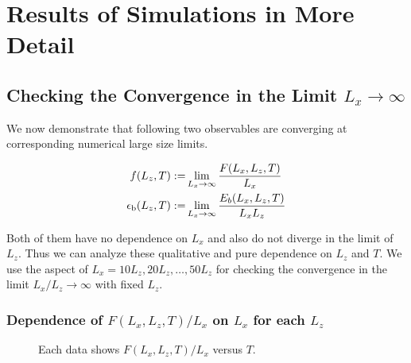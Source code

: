 
\chapter{Results of Simulations in More Detail}

\section{Checking the Convergence in the Limit $L_{x}\to\infty$}
\label{sec:convcheck}

We now demonstrate that following two observables are converging at corresponding numerical large size limits.

\begin{align}
	f(L_{z}, T):=&\lim_{L_{x}\to\infty}\frac{F(L_{x}, L_{z}, T)}{L_{x}}\\
	\epsilon_{\rm b}(L_{z}, T):=&\lim_{L_{x}\to\infty}\frac{E_{b}(L_{x}, L_{z}, T)}{L_{x}L_{z}}
\end{align}

Both of them have no dependence on $L_{x}$ and also do not diverge in the limit of $L_{z}$. Thus we can analyze these qualitative and pure dependence on $L_{z}$ and $T$. We use the aspect of $L_{x}=10L_{z}, 20L_{z}, \dots, 50L_{z}$ for checking the convergence in the limit $L_{x}/L_{z} \to \infty$ with fixed $L_{z}$.

\subsection{Dependence of $F(L_{x}, L_{z}, T)/L_{x}$ on $L_{x}$ for each $L_{z}$}

\begin{figure}[htbp]
	\centering
	
	
	
	\caption{Each data shows $F(L_{x}, L_{z}, T)/L_{x}$ versus $T$.}
	\label{fig:ffdcheck}
\end{figure}

